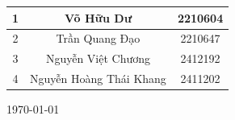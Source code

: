 \begin{titlepage}
\begin{center}
\begin{table}[H]
\begin{tabular}{|c|c|c|}
                \hline
                1 & Võ Hữu Dư & 2210604\\
                \hline
                2 & Trần Quang Đạo & 2210647\\
                \hline
                3 & Nguyễn Việt Chương & 2412192\\
                \hline
                4 & Nguyễn Hoàng Thái Khang & 2411202\\
                \hline
            \end{tabular}
        \end{table}
    \end{center}        
    \vfill
    \large
    \begin{center}
        \today
    \end{center}
\end{titlepage}